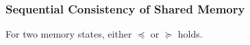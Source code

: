 \documentclass[slidestop,compress,mathserif]{beamer}
\begin{document}
\begin{frame}
\vfill
 \end{frame}

\begin{frame}
 \frametitle{Sequential Consistency of Shared Memory}

For two memory states, either $\preceq$ or $\succeq$ holds.
\vfill

\end{frame}
\end{document}
